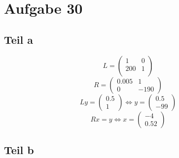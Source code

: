 \documentclass[10pt,a4paper]{article}
\begin{document}
\section{Aufgabe 30}

\subsection{Teil a}

\begin{equation}
  L = \begin{pmatrix}
    1 & 0\\
    200 & 1\\
  \end{pmatrix}
\end{equation}
\begin{equation}
  R = \begin{pmatrix}
    0.005 & 1\\
    0 & -190
  \end{pmatrix}
\end{equation}
\begin{equation}
  Ly = \begin{pmatrix}
    0.5\\1
  \end{pmatrix}
  \Leftrightarrow
  y = \begin{pmatrix}
    0.5\\-99
  \end{pmatrix}
\end{equation}
\begin{equation}
  Rx = y \Leftrightarrow
  x = \begin{pmatrix}
    -4\\0.52
  \end{pmatrix}
\end{equation}

\subsection{Teil b}
\end{document}
